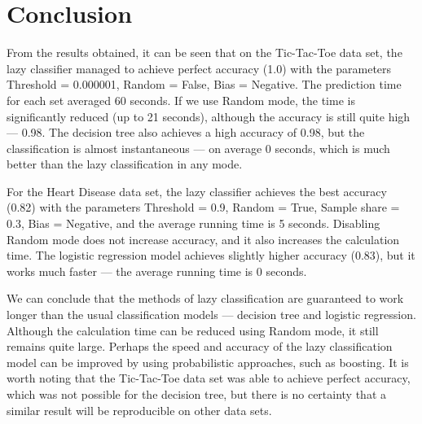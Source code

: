 \documentclass{article}
\begin{document}
\section{Conclusion}

From the results obtained, it can be seen that on the Tic-Tac-Toe data set, the lazy classifier managed to achieve perfect accuracy (1.0) with the parameters Threshold = 0.000001, Random = False, Bias = Negative. The prediction time for each set averaged 60 seconds. If we use Random mode, the time is significantly reduced (up to 21 seconds), although the accuracy is still quite high --- 0.98. The decision tree also achieves a high accuracy of 0.98, but the classification is almost instantaneous --- on average 0 seconds, which is much better than the lazy classification in any mode.

For the Heart Disease data set, the lazy classifier achieves the best accuracy (0.82) with the parameters Threshold = 0.9, Random = True, Sample share = 0.3, Bias = Negative, and the average running time is 5 seconds. Disabling Random mode does not increase accuracy, and it also increases the calculation time. The logistic regression model achieves slightly higher accuracy (0.83), but it works much faster --- the average running time is 0 seconds.

We can conclude that the methods of lazy classification are guaranteed to work longer than the usual classification models --- decision tree and logistic regression. Although the calculation time can be reduced using Random mode, it still remains quite large. Perhaps the speed and accuracy of the lazy classification model can be improved by using probabilistic approaches, such as boosting. It is worth noting that the Tic-Tac-Toe data set was able to achieve perfect accuracy, which was not possible for the decision tree, but there is no certainty that a similar result will be reproducible on other data sets.
\end{document}
